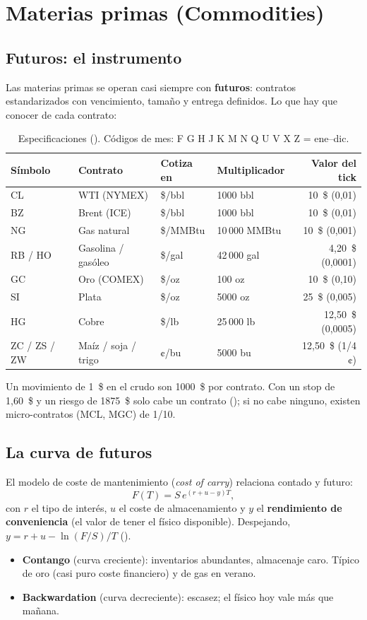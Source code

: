 \chapter{Materias primas (Commodities)}\label{cap:commodities}

\section{Futuros: el instrumento}
Las materias primas se operan casi siempre con \textbf{futuros}: contratos estandarizados con
vencimiento, tamaño y entrega definidos. Lo que hay que conocer de cada contrato:
\begin{table}[h]\centering\small
\begin{tabular}{llllr}
\toprule
Símbolo & Contrato & Cotiza en & Multiplicador & Valor del tick \\ \midrule
CL & WTI (NYMEX) & \$/bbl & 1000 bbl & 10~\$ (0,01) \\
BZ & Brent (ICE) & \$/bbl & 1000 bbl & 10~\$ (0,01) \\
NG & Gas natural & \$/MMBtu & 10\,000 MMBtu & 10~\$ (0,001) \\
RB / HO & Gasolina / gasóleo & \$/gal & 42\,000 gal & 4,20~\$ (0,0001) \\
GC & Oro (COMEX) & \$/oz & 100 oz & 10~\$ (0,10) \\
SI & Plata & \$/oz & 5000 oz & 25~\$ (0,005) \\
HG & Cobre & \$/lb & 25\,000 lb & 12,50~\$ (0,0005) \\
ZC / ZS / ZW & Maíz / soja / trigo & ¢/bu & 5000 bu & 12,50~\$ (1/4 ¢) \\
\bottomrule
\end{tabular}
\caption{Especificaciones (). Códigos de mes: F G H J K M N Q U V X Z = ene--dic.}
\end{table}

Un movimiento de 1~\$ en el crudo son 1000~\$ por contrato. Con un stop de 1,60~\$ y un riesgo de
1875~\$ solo cabe un contrato (); si no cabe ninguno, existen
micro-contratos (MCL, MGC) de 1/10.

\section{La curva de futuros}
El modelo de coste de mantenimiento (\emph{cost of carry}) relaciona contado y futuro:
\begin{equation}\label{eq:carry}
F(T) = S\,e^{(r+u-y)T},
\end{equation}
con $r$ el tipo de interés, $u$ el coste de almacenamiento y $y$ el \textbf{rendimiento de
conveniencia} (el valor de tener el físico disponible). Despejando,
$y = r+u-\ln(F/S)/T$ ().
\begin{itemize}
\item \textbf{Contango} (curva creciente): inventarios abundantes, almacenaje caro. Típico de oro (casi
  puro coste financiero) y de gas en verano.
\item \textbf{Backwardation} (curva decreciente): escasez; el físico hoy vale más que mañana.
\end{itemize}

